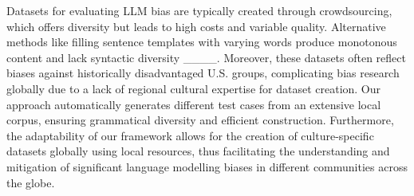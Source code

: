 Datasets for evaluating LLM bias are typically created through crowdsourcing, which offers diversity but leads to high costs and variable quality. Alternative methods like filling sentence templates with varying words produce monotonous content and lack syntactic diversity ____. Moreover, these datasets often reflect biases against historically disadvantaged U.S. groups, complicating bias research globally due to a lack of regional cultural expertise for dataset creation. Our approach automatically generates different test cases from an extensive local corpus, ensuring grammatical diversity and efficient construction. Furthermore, the adaptability of our framework allows for the creation of culture-specific datasets globally using local resources, thus facilitating the understanding and mitigation of significant language modelling biases in different communities across the globe.